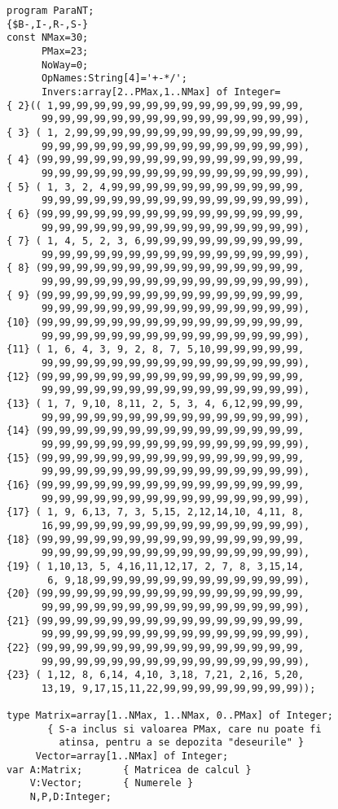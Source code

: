 \begin{verbatim}
program ParaNT;
{$B-,I-,R-,S-}
const NMax=30;
      PMax=23;
      NoWay=0;
      OpNames:String[4]='+-*/';
      Invers:array[2..PMax,1..NMax] of Integer=
{ 2}(( 1,99,99,99,99,99,99,99,99,99,99,99,99,99,99,
      99,99,99,99,99,99,99,99,99,99,99,99,99,99,99),
{ 3} ( 1, 2,99,99,99,99,99,99,99,99,99,99,99,99,99,
      99,99,99,99,99,99,99,99,99,99,99,99,99,99,99),
{ 4} (99,99,99,99,99,99,99,99,99,99,99,99,99,99,99,
      99,99,99,99,99,99,99,99,99,99,99,99,99,99,99),
{ 5} ( 1, 3, 2, 4,99,99,99,99,99,99,99,99,99,99,99,
      99,99,99,99,99,99,99,99,99,99,99,99,99,99,99),
{ 6} (99,99,99,99,99,99,99,99,99,99,99,99,99,99,99,
      99,99,99,99,99,99,99,99,99,99,99,99,99,99,99),
{ 7} ( 1, 4, 5, 2, 3, 6,99,99,99,99,99,99,99,99,99,
      99,99,99,99,99,99,99,99,99,99,99,99,99,99,99),
{ 8} (99,99,99,99,99,99,99,99,99,99,99,99,99,99,99,
      99,99,99,99,99,99,99,99,99,99,99,99,99,99,99),
{ 9} (99,99,99,99,99,99,99,99,99,99,99,99,99,99,99,
      99,99,99,99,99,99,99,99,99,99,99,99,99,99,99),
{10} (99,99,99,99,99,99,99,99,99,99,99,99,99,99,99,
      99,99,99,99,99,99,99,99,99,99,99,99,99,99,99),
{11} ( 1, 6, 4, 3, 9, 2, 8, 7, 5,10,99,99,99,99,99,
      99,99,99,99,99,99,99,99,99,99,99,99,99,99,99),
{12} (99,99,99,99,99,99,99,99,99,99,99,99,99,99,99,
      99,99,99,99,99,99,99,99,99,99,99,99,99,99,99),
{13} ( 1, 7, 9,10, 8,11, 2, 5, 3, 4, 6,12,99,99,99,
      99,99,99,99,99,99,99,99,99,99,99,99,99,99,99),
{14} (99,99,99,99,99,99,99,99,99,99,99,99,99,99,99,
      99,99,99,99,99,99,99,99,99,99,99,99,99,99,99),
{15} (99,99,99,99,99,99,99,99,99,99,99,99,99,99,99,
      99,99,99,99,99,99,99,99,99,99,99,99,99,99,99),
{16} (99,99,99,99,99,99,99,99,99,99,99,99,99,99,99,
      99,99,99,99,99,99,99,99,99,99,99,99,99,99,99),
{17} ( 1, 9, 6,13, 7, 3, 5,15, 2,12,14,10, 4,11, 8,
      16,99,99,99,99,99,99,99,99,99,99,99,99,99,99),
{18} (99,99,99,99,99,99,99,99,99,99,99,99,99,99,99,
      99,99,99,99,99,99,99,99,99,99,99,99,99,99,99),
{19} ( 1,10,13, 5, 4,16,11,12,17, 2, 7, 8, 3,15,14,
       6, 9,18,99,99,99,99,99,99,99,99,99,99,99,99),
{20} (99,99,99,99,99,99,99,99,99,99,99,99,99,99,99,
      99,99,99,99,99,99,99,99,99,99,99,99,99,99,99),
{21} (99,99,99,99,99,99,99,99,99,99,99,99,99,99,99,
      99,99,99,99,99,99,99,99,99,99,99,99,99,99,99),
{22} (99,99,99,99,99,99,99,99,99,99,99,99,99,99,99,
      99,99,99,99,99,99,99,99,99,99,99,99,99,99,99),
{23} ( 1,12, 8, 6,14, 4,10, 3,18, 7,21, 2,16, 5,20,
      13,19, 9,17,15,11,22,99,99,99,99,99,99,99,99));

type Matrix=array[1..NMax, 1..NMax, 0..PMax] of Integer;
       { S-a inclus si valoarea PMax, care nu poate fi
         atinsa, pentru a se depozita "deseurile" }
     Vector=array[1..NMax] of Integer;
var A:Matrix;       { Matricea de calcul }
    V:Vector;       { Numerele }
    N,P,D:Integer;


\end{verbatim}
